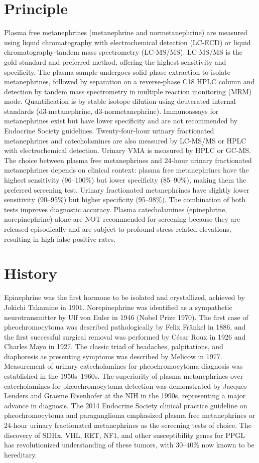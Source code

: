 \section*{Principle}
Plasma free metanephrines (metanephrine and normetanephrine) are measured using liquid chromatography with electrochemical detection (LC-ECD) or liquid chromatography-tandem mass spectrometry (LC-MS/MS). LC-MS/MS is the gold standard and preferred method, offering the highest sensitivity and specificity. The plasma sample undergoes solid-phase extraction to isolate metanephrines, followed by separation on a reverse-phase C18 HPLC column and detection by tandem mass spectrometry in multiple reaction monitoring (MRM) mode. Quantification is by stable isotope dilution using deuterated internal standards (d3-metanephrine, d3-normetanephrine). Immunoassays for metanephrines exist but have lower specificity and are not recommended by Endocrine Society guidelines. Twenty-four-hour urinary fractionated metanephrines and catecholamines are also measured by LC-MS/MS or HPLC with electrochemical detection. Urinary VMA is measured by HPLC or GC-MS. The choice between plasma free metanephrines and 24-hour urinary fractionated metanephrines depends on clinical context: plasma free metanephrines have the highest sensitivity (96--100\%) but lower specificity (85--90\%), making them the preferred screening test. Urinary fractionated metanephrines have slightly lower sensitivity (90--95\%) but higher specificity (95--98\%). The combination of both tests improves diagnostic accuracy. Plasma catecholamines (epinephrine, norepinephrine) alone are NOT recommended for screening because they are released episodically and are subject to profound stress-related elevations, resulting in high false-positive rates.

\section*{History}
Epinephrine was the first hormone to be isolated and crystallized, achieved by Jokichi Takamine in 1901. Norepinephrine was identified as a sympathetic neurotransmitter by Ulf von Euler in 1946 (Nobel Prize 1970). The first case of pheochromocytoma was described pathologically by Felix Fränkel in 1886, and the first successful surgical removal was performed by César Roux in 1926 and Charles Mayo in 1927. The classic triad of headaches, palpitations, and diaphoresis as presenting symptoms was described by Melicow in 1977. Measurement of urinary catecholamines for pheochromocytoma diagnosis was established in the 1950s--1960s. The superiority of plasma metanephrines over catecholamines for pheochromocytoma detection was demonstrated by Jacques Lenders and Graeme Eisenhofer at the NIH in the 1990s, representing a major advance in diagnosis. The 2014 Endocrine Society clinical practice guideline on pheochromocytoma and paraganglioma emphasized plasma free metanephrines or 24-hour urinary fractionated metanephrines as the screening tests of choice. The discovery of SDHx, VHL, RET, NF1, and other susceptibility genes for PPGL has revolutionized understanding of these tumors, with 30--40\% now known to be hereditary.

